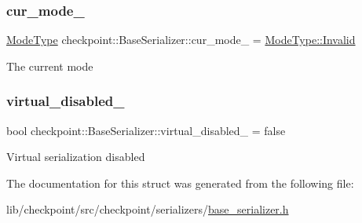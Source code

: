 \subsubsection{\texorpdfstring{cur\+\_\+mode\+\_\+}{cur\_mode\_}}
{\footnotesize\ttfamily \hyperlink{namespacecheckpoint_ae2509499ccd8b1dc48fb535bf8aa3059}{Mode\+Type} checkpoint\+::\+Base\+Serializer\+::cur\+\_\+mode\+\_\+ = \hyperlink{namespacecheckpoint_ae2509499ccd8b1dc48fb535bf8aa3059a4bbb8f967da6d1a610596d7257179c2b}{Mode\+Type\+::\+Invalid}\hspace{0.3cm}{\ttfamily [protected]}}

The current mode \mbox{\label{structcheckpoint_1_1_base_serializer_acdffc3101eb51baafe4a13939ba23e70}} 
\subsubsection{\texorpdfstring{virtual\+\_\+disabled\+\_\+}{virtual\_disabled\_}}
{\footnotesize\ttfamily bool checkpoint\+::\+Base\+Serializer\+::virtual\+\_\+disabled\+\_\+ = false\hspace{0.3cm}{\ttfamily [protected]}}

Virtual serialization disabled 

The documentation for this struct was generated from the following file\+:\begin{DoxyCompactItemize}
\item 
lib/checkpoint/src/checkpoint/serializers/\hyperlink{base__serializer_8h}{base\+\_\+serializer.\+h}\end{DoxyCompactItemize}
